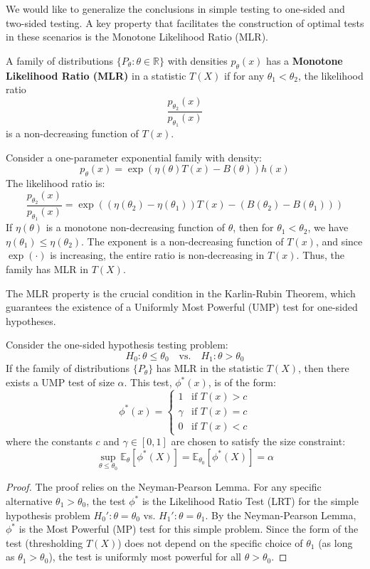 We would like to generalize the conclusions in simple testing to one-sided and two-sided testing. A key property that facilitates the construction of optimal tests in these scenarios is the Monotone Likelihood Ratio (MLR).

\begin{de}
A family of distributions $\{P_{\theta} : \theta \in \mathbb{R}\}$ with densities $p_{\theta}(x)$ has a \textbf{Monotone Likelihood Ratio (MLR)} in a statistic $T(X)$ if for any $\theta_1 < \theta_2$, the likelihood ratio
$$
\frac{p_{\theta_2}(x)}{p_{\theta_1}(x)}
$$
is a non-decreasing function of $T(x)$.
\end{de}

\begin{eg}
    Consider a one-parameter exponential family with density:
$$
p_{\theta}(x) = \exp(\eta(\theta)T(x) - B(\theta))h(x)
$$
The likelihood ratio is:
$$
\frac{p_{\theta_2}(x)}{p_{\theta_1}(x)} = \exp\left( (\eta(\theta_2) - \eta(\theta_1))T(x) - (B(\theta_2) - B(\theta_1)) \right)
$$
If $\eta(\theta)$ is a monotone non-decreasing function of $\theta$, then for $\theta_1 < \theta_2$, we have $\eta(\theta_1) \le \eta(\theta_2)$. The exponent is a non-decreasing function of $T(x)$, and since $\exp(\cdot)$ is increasing, the entire ratio is non-decreasing in $T(x)$. Thus, the family has MLR in $T(X)$.
\end{eg}

The MLR property is the crucial condition in the Karlin-Rubin Theorem, which guarantees the existence of a Uniformly Most Powerful (UMP) test for one-sided hypotheses.
\begin{thm}
Consider the one-sided hypothesis testing problem:
$$
H_0: \theta \le \theta_0 \quad \text{vs.} \quad H_1: \theta > \theta_0
$$
If the family of distributions $\{P_{\theta}\}$ has MLR in the statistic $T(X)$, then there exists a UMP test of size $\alpha$. This test, $\phi^*(x)$, is of the form:
$$
\phi^*(x) = 
\begin{cases} 
1 & \text{if } T(x) > c \\
\gamma & \text{if } T(x) = c \\
0 & \text{if } T(x) < c 
\end{cases}
$$
where the constants $c$ and $\gamma \in [0, 1]$ are chosen to satisfy the size constraint:
$$
\sup_{\theta \le \theta_0} \mathbb{E}_{\theta}[\phi^*(X)] = \mathbb{E}_{\theta_0}[\phi^*(X)] = \alpha
$$
\end{thm}

\begin{proof}
The proof relies on the Neyman-Pearson Lemma. For any specific alternative $\theta_1 > \theta_0$, the test $\phi^*$ is the Likelihood Ratio Test (LRT) for the simple hypothesis problem $H_0': \theta = \theta_0$ vs. $H_1': \theta = \theta_1$. By the Neyman-Pearson Lemma, $\phi^*$ is the Most Powerful (MP) test for this simple problem. Since the form of the test (thresholding $T(X)$) does not depend on the specific choice of $\theta_1$ (as long as $\theta_1 > \theta_0$), the test is uniformly most powerful for all $\theta > \theta_0$.
\end{proof}

